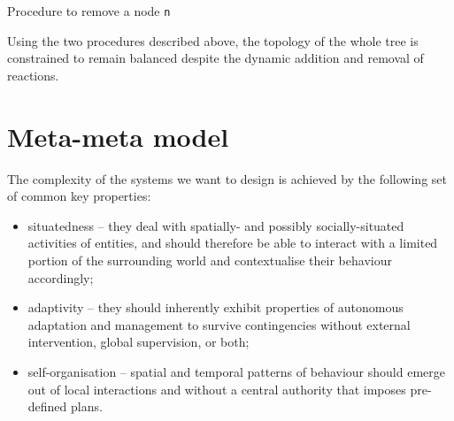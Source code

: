 \documentclass[12pt,a4paper,twoside,openright]{book}
\begin{document}
\begin{algorithm}
\begin{distribalgo}[1]
\vspace{5pt}
  \ELSE
  \ENDIF
\ENDWHILE
{}
\ELSE
\ENDIF
\caption{Procedure to remove a node \texttt{n}}
\label{algo:remnode}
\end{distribalgo}
\end{algorithm}

Using the two procedures described above, the topology of the whole tree is constrained to remain balanced despite the dynamic addition and removal of reactions.

\chapter{Meta-meta model}
\label{meta-meta-model}
The complexity of the systems we want to design is achieved by the following set of common key properties:
\begin{itemize}
 \item situatedness -- they deal with spatially- and possibly socially-situated activities of entities, and should therefore be able to interact with a limited portion of the surrounding world and contextualise their behaviour accordingly; 
 \item adaptivity -- they should inherently exhibit properties of autonomous adaptation and management to survive contingencies without external intervention, global supervision, or both; 
 \item self-organisation -- spatial and temporal patterns of behaviour should emerge out of local interactions and without a central authority that imposes pre-defined plans.
\end{itemize}
\end{document}
